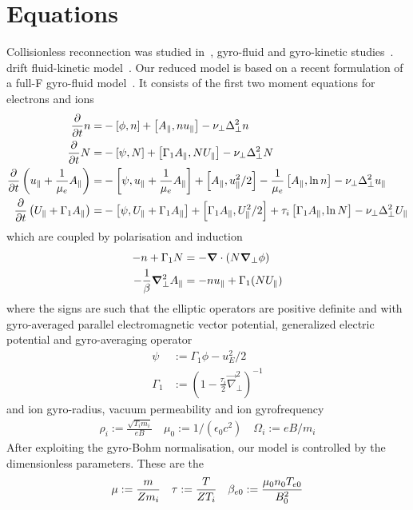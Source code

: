 \section{Equations}
Collisionless reconnection was studied in~\cite{stanier15}, gyro-fluid and gyro-kinetic studies~\cite{comisso13,zacharias14}. drift fluid-kinetic model~\cite{loureiro13}.
Our reduced model is based on a recent formulation of a full-F gyro-fluid model~\cite{Madsen2013}.
It consists of the first two moment equations for electrons and ions
\begin{align}
\frac{\partial}{\partial t} \ne =&
 - \left[\phi, \ne\right]
+ \left[\Apar,\ne \ue  \right]
-\nu_\perp \Delta_\perp^2\ne
\\
\label{firstgyromom}
\frac{\partial}{\partial t} \Ni =&
 - \left[\psi, \Ni\right]
+ \left[\Gamma_1 \Apar ,\Ni \Ui  \right]
-\nu_\perp \Delta_\perp^2\Ni
 \\
\frac{\partial}{\partial t} \left( \ue+ \frac{1}{\mu_e} \Apar \right) =&
      -  \left[ \psi, \ue+ \frac{1}{\mu_e} \Apar  \right]%
    +   \left[\Apar,\ue^2/2   \right]%
      - \frac{1}{\mu_e}  \left[\Apar,\ln{\ne}   \right]
    -\nu_\perp \Delta_\perp^2\ue
      \\
      \frac{\partial}{\partial t} \left( \Ui+ \Gamma_1 \Apar  \right) =&
      -  \left[ \psi, \Ui+ \Gamma_1 \Apar  \right]%
     +   \left[\Gamma_1 \Apar,\Ui^2/2   \right]%
      + \tau_i  \left[\Gamma_1 \Apar,\ln{\Ni}   \right]
    -\nu_\perp \Delta_\perp^2\Ui
\end{align}
which are coupled by polarisation and induction
\begin{align}
 -n  + \Gamma_1 N &= -{\boldsymbol{\nabla}}\cdot\left(N {\boldsymbol{\nabla}}_\perp \phi\right) \\
 -\frac{1}{\beta} {\boldsymbol{\nabla}}_\perp^2 A_\parallel &=  -n  u_\parallel + \Gamma_1 (N U_\parallel)
\end{align}
where the signs are such that the elliptic operators are positive definite and
with gyro-averaged parallel electromagnetic vector potential, generalized electric potential and gyro-averaging operator
\begin{align}
 \psi &:= \Gamma_1 \phi - u_E^2 /2  \\
  \Gamma_1 &:= (1-\frac{\tau_i}{2} \vec{\nabla}_\perp^2 )^{-1}
\end{align}
and ion gyro-radius, vacuum permeability and ion gyrofrequency
\begin{align}
  \rho_{i}   := \frac{\sqrt{T_{i} m_i}}{e B} \quad
  \mu_0 := 1/(\epsilon_0 c^2) \quad
  \Omega_i := e B / m_i
\end{align}
After exploiting the gyro-Bohm normalisation, our model is controlled by the dimensionless parameters. These
are the
\begin{align}
 \mu   :=  \frac{m}{Z m_i} \quad
 \tau  :=  \frac{T}{ Z T_i}\quad
 \beta_{e0} :=  \frac{\mu_0 n_0 T_{e0} }{ B_0^2 }
\end{align}

